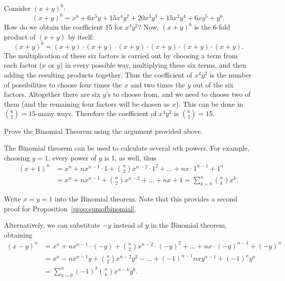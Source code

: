Consider $(x+y)^6$:
\[
(x+y)^6 = x^6 + 6x^5y + 15x^4y^2 + 20x^3y^3 + 15x^2y^4 + 6xy^5 + y^6. 
\] 
How do we obtain the coefficient 15 for $x^4y^2$? 
Now, $(x+y)^6$ is the 6-fold product of $(x+y)$ by itself: 
\[
(x+y)^6 = (x+y) \cdot (x+y) \cdot (x+y) \cdot (x+y) \cdot (x+y) \cdot (x+y). 
\]
The multiplication of these six factors is carried out by choosing a term from each factor ($x$ or $y$) in every possible way, 
multiplying these six terms, and then adding the resulting products together. 
Thus the coefficient of $x^4y^2$ is the number of possibilities to choose four times the $x$ and two times the $y$ out of the six factors. 
Altogether there are six $y$'s to choose from, 
and we need to choose two of them (and the remaining four factors will be chosen as $x$). 
This can be done in $\binom{6}{2} = 15$-many ways. 
Therefore the coefficient of $x^4y^2$ is $\binom{6}{2} = 15$. 

\begin{exercise}\label{ex:binomialnchoosek}
Prove the Binomial Theorem using the argument provided above. 
\end{exercise}

The Binomial theorem can be used to calculate several $n$th powers. 
For example, 
choosing $y=1$, every power of $y$ is 1, as well, thus 
\begin{align*}
(x+1)^n &= x^n + n x^{n-1}\cdot 1 + \binom{n}{2} x^{n-2}\cdot 1^2 + \dots + n x \cdot 1^{n-1} + 1^n \\
&= x^n + n x^{n-1} + \binom{n}{2} x^{n-2} + \dots + n x + 1 = \sum_{k=0}^n \binom{n}{k} x^k. 
\end{align*}

\begin{exercise}\label{ex:binomial1+1}
Write $x=y=1$ into the Binomial theorem. 
Note that this provides a second proof for Proposition~\ref{prop:sumofbinomial}. 
\end{exercise}

Alternatively, we can substitute $-y$ instead of $y$ in the Binomial theorem, obtaining 
\begin{align*}
(x-y)^n &= x^n + n x^{n-1}\cdot (-y) + \binom{n}{2} x^{n-2}\cdot (-y)^2 + \dots + n x \cdot (-y)^{n-1} + (-y)^n \\
&= x^n - n x^{n-1} y + \binom{n}{2} x^{n-2} y^2 - \dots + (-1)^{n-1} n x y^{n-1} + (-1)^n y^n \\
&= \sum_{k=0}^n (-1)^k \binom{n}{k} x^{n-k}y^{k}. 
\end{align*}

